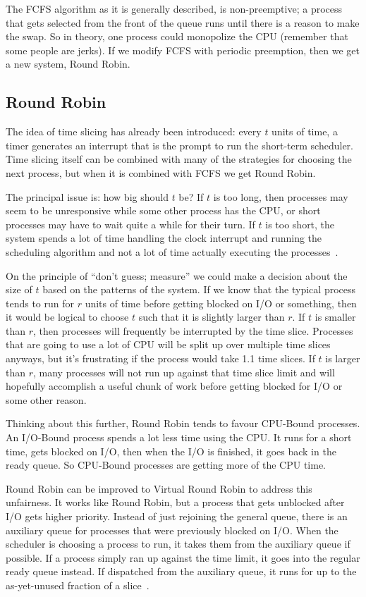 The FCFS algorithm as it is generally described, is non-preemptive; a process that gets selected from the front of the queue runs until there is a reason to make the swap. So in theory, one process could monopolize the CPU (remember that some people are jerks). If we modify FCFS with periodic preemption, then we get a new system, Round Robin.

\subsection*{Round Robin}
The idea of time slicing has already been introduced: every $t$ units of time, a timer generates an interrupt that is the prompt to run the short-term scheduler. Time slicing itself can be combined with many of the strategies for choosing the next process, but when it is combined with FCFS we get Round Robin. 

The principal issue is: how big should $t$ be? If $t$ is too long, then processes may seem to be unresponsive while some other process has the CPU, or short processes may have to wait quite a while for their turn. If $t$ is too short, the system spends a lot of time handling the clock interrupt and running the scheduling algorithm and not a lot of time actually executing the processes~\cite{osi}.

On the principle of ``don't guess; measure'' we could make a decision about the size of $t$ based on the patterns of the system. If we know that the typical process tends to run for $r$ units of time before getting blocked on I/O or something, then it would be logical to choose $t$ such that it is slightly larger than $r$. If $t$ is smaller than $r$, then processes will frequently be interrupted by the time slice. Processes that are going to use a lot of CPU will be split up over multiple time slices anyways, but it's frustrating if the process would take 1.1 time slices. If $t$ is larger than $r$, many processes will not run up against that time slice limit and will hopefully accomplish a useful chunk of work before getting blocked for I/O or some other reason. 

Thinking about this further, Round Robin tends to favour CPU-Bound processes. An I/O-Bound process spends a lot less time using the CPU. It runs for a short time, gets blocked on I/O, then when the I/O is finished, it goes back in the ready queue. So CPU-Bound processes are getting more of the CPU time.

Round Robin can be improved to Virtual Round Robin to address this unfairness. It works like Round Robin, but a process that gets unblocked after I/O gets higher priority. Instead of just rejoining the general queue, there is an auxiliary queue for processes that were previously blocked on I/O. When the scheduler is choosing a process to run, it takes them from the auxiliary queue if possible. If a process simply ran up against the time limit, it goes into the regular ready queue instead. If dispatched from the auxiliary queue, it runs for up to the as-yet-unused fraction of a slice~\cite{vrr}.

